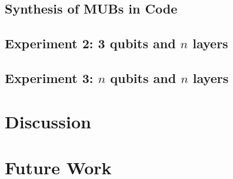 \documentclass[a4paper,12pt]{article}
\begin{document}
\subsection{Synthesis of MUBs in Code}


\subsection{Experiment 2: 3 qubits and $n$ layers} \label{subsec:3qubits}

\subsection{Experiment 3: $n$ qubits and $n$ layers} \label{subsec:nqubits}

\section{Discussion}

\section{Future Work}

\printbibliography
\end{document}
